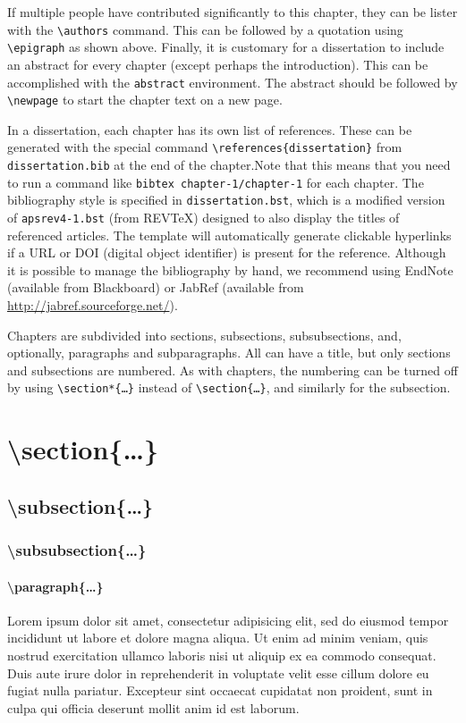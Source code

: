 If multiple people have contributed significantly to this chapter, they can be lister with the \texttt{\textbackslash authors} command.
This can be followed by a quotation using \texttt{\textbackslash epigraph} as shown above.
Finally, it is customary for a dissertation to include an abstract for every chapter (except perhaps the introduction).
This can be accomplished with the \texttt{abstract} environment.
The abstract should be followed by \texttt{\textbackslash newpage} to start the chapter text on a new page.

In a dissertation, each chapter has its own list of references.
These can be generated with the special command \texttt{\textbackslash references\{dissertation\}} from \texttt{dissertation.bib} at the end of the chapter.Note that this means that you need to run a command like \texttt{bibtex chapter-1/chapter-1} for each chapter.
The bibliography style is specified in \texttt{dissertation.bst}, which is a modified version of \texttt{apsrev4-1.bst} (from REVTeX) designed to also display the titles of referenced articles.
The template will automatically generate clickable hyperlinks if a URL or DOI (digital object identifier) is present for the reference.
Although it is possible to manage the bibliography by hand, we recommend using EndNote (available from Blackboard) or JabRef (available from \url{http://jabref.sourceforge.net/}).

Chapters are subdivided into sections, subsections, subsubsections, and, optionally, paragraphs and subparagraphs.
All can have a title, but only sections and subsections are numbered.
As with chapters, the numbering can be turned off by using \texttt{\textbackslash section*\{\ldots\}} instead of \texttt{\textbackslash section\{\ldots\}}, and similarly for the subsection.
\section{\textbackslash section\{\ldots\}}
\subsection{\textbackslash subsection\{\ldots\}}
\subsubsection{\textbackslash subsubsection\{\ldots\}}
\paragraph{\textbackslash paragraph\{\ldots\}}
Lorem ipsum dolor sit amet, consectetur adipisicing elit, sed do eiusmod tempor incididunt ut labore et dolore magna aliqua.
Ut enim ad minim veniam, quis nostrud exercitation ullamco laboris nisi ut aliquip ex ea commodo consequat.
Duis aute irure dolor in reprehenderit in voluptate velit esse cillum dolore eu fugiat nulla pariatur.
Excepteur sint occaecat cupidatat non proident, sunt in culpa qui officia deserunt mollit anim id est laborum.

